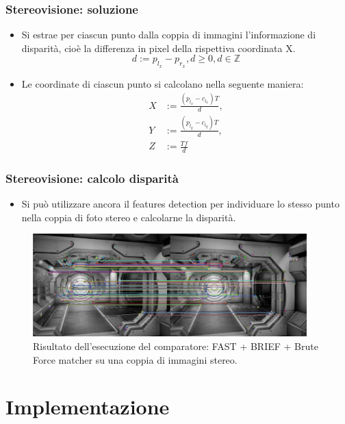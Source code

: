 \documentclass{beamer}
\begin{document}
\begin{frame}
\frametitle{Stereovisione: soluzione}
\begin{itemize}
	\item Si estrae per ciascun punto dalla coppia di immagini l'informazione di disparità, cioè la differenza in pixel della rispettiva coordinata X.
	\begin{equation}
		d := p_{l_x} - p_{r_x}, d \ge 0, d \in \mathbb{Z}
	\end{equation}
	\item Le coordinate di ciascun punto si calcolano nella seguente maniera:
	\begin{align}
	X &:= \frac{(p_{l_x} - c_{l_x}) T}{d},\\
	Y &:= \frac{(p_{l_y} - c_{l_y}) T}{d},\\
	Z &:= \frac{Tf}{d}
	\end{align}
\end{itemize}
\end{frame}

\begin{frame}
\frametitle{Stereovisione: calcolo disparità}
\begin{itemize}
	\item Si può utilizzare ancora il features detection per individuare lo stesso punto nella coppia di foto stereo e calcolarne la disparità.
\end{itemize}
\begin{figure}[h!]
	\centering
	\includegraphics[width=300pt]{imgs/stereoDetection.jpg}
	\caption{Risultato dell'esecuzione del comparatore: FAST + BRIEF + Brute Force matcher su una coppia di immagini stereo.}
	\label{vis:feature:risStereo}
\end{figure} 
\end{frame}

\section{Implementazione}
\end{document}
